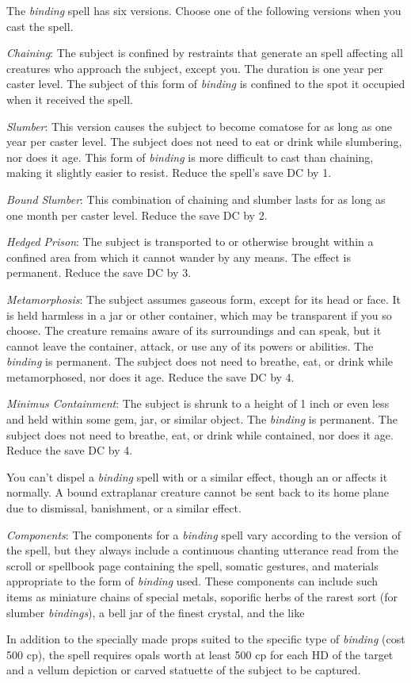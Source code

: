 {	The \emph{binding} spell has six versions. Choose one of the following versions when you cast the spell.

	\textit{Chaining}:
	The subject is confined by restraints that generate an  spell affecting all creatures who approach the subject, except you. The duration is one year per caster level. The subject of this form of \emph{binding} is confined to the spot it occupied when it received the spell.

	\textit{Slumber}:
	This version causes the subject to become comatose for as long as one year per caster level. The subject does not need to eat or drink while slumbering, nor does it age. This form of \emph{binding} is more difficult to cast than chaining, making it slightly easier to resist. Reduce the spell's save DC by 1.

	\textit{Bound Slumber}:
	This combination of chaining and slumber lasts for as long as one month per caster level. Reduce the save DC by 2.

	\textit{Hedged Prison}:
	The subject is transported to or otherwise brought within a confined area from which it cannot wander by any means. The effect is permanent. Reduce the save DC by 3.

	\textit{Metamorphosis}:
	The subject assumes gaseous form, except for its head or face. It is held harmless in a jar or other container, which may be transparent if you so choose. The creature remains aware of its surroundings and can speak, but it cannot leave the container, attack, or use any of its powers or abilities. The \emph{binding} is permanent. The subject does not need to breathe, eat, or drink while metamorphosed, nor does it age. Reduce the save DC by 4.

	\textit{Minimus Containment}:
	The subject is shrunk to a height of 1 inch or even less and held within some gem, jar, or similar object. The \emph{binding} is permanent. The subject does not need to breathe, eat, or drink while contained, nor does it age. Reduce the save DC by 4.

	You can't dispel a \emph{binding} spell with  or a similar effect, though an  or  affects it normally. A bound extraplanar creature cannot be sent back to its home plane due to dismissal, banishment, or a similar effect.

	\textit{Components}:
	The components for a \emph{binding} spell vary according to the version of the spell, but they always include a continuous chanting utterance read from the scroll or spellbook page containing the spell, somatic gestures, and materials appropriate to the form of \emph{binding} used. These components can include such items as miniature chains of special metals, soporific herbs of the rarest sort (for slumber \emph{bindings}), a bell jar of the finest crystal, and the like

	In addition to the specially made props suited to the specific type of \emph{binding} (cost 500 cp), the spell requires opals worth at least 500 cp for each HD of the target and a vellum depiction or carved statuette of the subject to be captured.

}

